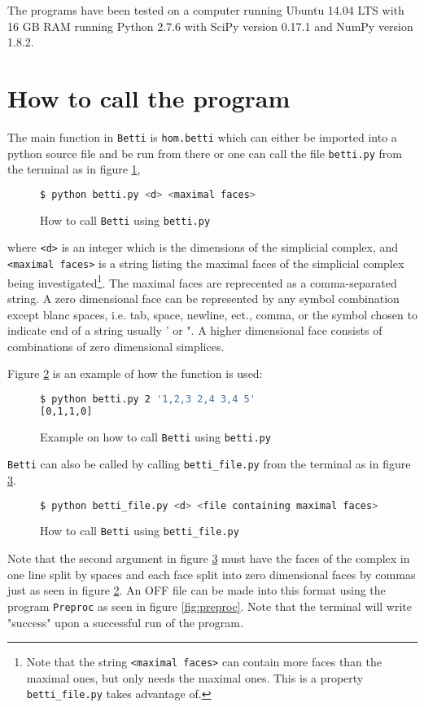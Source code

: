 \documentclass[11pt,a4paper,twoside]{report}
\begin{document}
The programs have been tested on a computer running Ubuntu 14.04 LTS with 16 GB RAM running Python 2.7.6 with SciPy version 0.17.1 and NumPy version 1.8.2.

\section{How to call the program} \label{ch:how2call}
The main function in \texttt{Betti} is \texttt{hom.betti} which can either be imported into a python source file and be run from there or one can call the file \texttt{betti.py} from the terminal as in figure \ref{fig:bettipseudo},
\begin{figure}[H]
\begin{lstlisting}[language=bash]
$ python betti.py <d> <maximal faces> 
\end{lstlisting}
\caption{How to call \texttt{Betti} using \texttt{betti.py}}
\label{fig:bettipseudo}
\end{figure}
where \texttt{<d>} is an integer which is the dimensions of the simplicial complex, and \texttt{<maximal faces>} is a string listing the maximal faces of the simplicial complex being investigated\footnote{Note that the string \texttt{<maximal faces>} can contain more faces than the maximal ones, but only needs the maximal ones. This is a property \texttt{betti\_file.py} takes advantage of.}. The maximal faces are reprecented as a comma-separated string. A zero dimensional face can be represented by any symbol combination except blanc spaces, i.e. tab, space, newline, ect., comma, or the symbol chosen to indicate end of a string usually ' or ". A higher dimensional face consists of combinations of zero dimensional simplices.

Figure \ref{fig:betti} is an example of how the function is used:
\begin{figure}[H]
\begin{lstlisting}[language=bash]
$ python betti.py 2 '1,2,3 2,4 3,4 5'
[0,1,1,0] 
\end{lstlisting}
\caption{Example on how to call \texttt{Betti} using \texttt{betti.py} }
\label{fig:betti}
\end{figure}

\texttt{Betti} can also be called by calling \texttt{betti\_file.py} from the terminal as in figure \ref{fig:bettifile}.
\begin{figure}[H]
\begin{lstlisting}[language=bash]
$ python betti_file.py <d> <file containing maximal faces> 
\end{lstlisting}
\caption{How to call \texttt{Betti} using \texttt{betti\_file.py}}
\label{fig:bettifile}
\end{figure}
Note that the second argument in figure \ref{fig:bettifile} must have the faces of the complex in one line split by spaces and each face split into zero dimensional faces by commas just as seen in figure \ref{fig:betti}. An OFF file can be made into this format using the program \texttt{Preproc} as seen in figure \ref{fig:preproc}. Note that the terminal will write "success" upon a successful run of the program.
\end{document}
